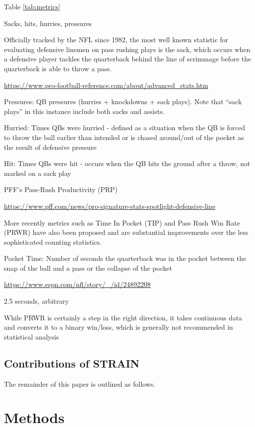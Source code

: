 \documentclass{statsoc}
\begin{document}
Table \ref{tab:metrics}

Sacks, hits, hurries, pressures

Officially tracked by the NFL since 1982, the most well known statistic
for evaluating defensive linemen on pass rushing plays is the sack,
which occurs when a defensive player tackles the quarterback behind the
line of scrimmage before the quarterback is able to throw a pass.

\url{https://www.pro-football-reference.com/about/advanced_stats.htm}

Pressures: QB pressures (hurries + knockdowns + sack plays). Note that
``sack plays'' in this instance include both sacks and assists.

Hurried: Times QBs were hurried - defined as a situation when the QB is
forced to throw the ball earlier than intended or is chased around/out
of the pocket as the result of defensive pressure

Hit: Times QBs were hit - occurs when the QB hits the ground after a
throw, not marked on a sack play

PFF's Pass-Rush Productivity (PRP)

\url{https://www.pff.com/news/pro-signature-stats-spotlight-defensive-line}

More recently metrics such as Time In Pocket (TIP) and Pass Rush Win
Rate (PRWR) have also been proposed and are substantial improvements
over the less sophisticated counting statistics.

Pocket Time: Number of seconds the quarterback was in the pocket between
the snap of the ball and a pass or the collapse of the pocket

\citet{Burke2018Created}

\url{https://www.espn.com/nfl/story/_/id/24892208}

2.5 seconds, arbitrary

While PRWR is certainly a step in the right direction, it takes
continuous data and converts it to a binary win/loss, which is generally
not recommended in statistical analysis

\hypertarget{contributions-of-strain}{%
\subsection{Contributions of STRAIN}\label{contributions-of-strain}}

The remainder of this paper is outlined as follows.

\hypertarget{methods}{%
\section{Methods}\label{methods}}
\end{document}
